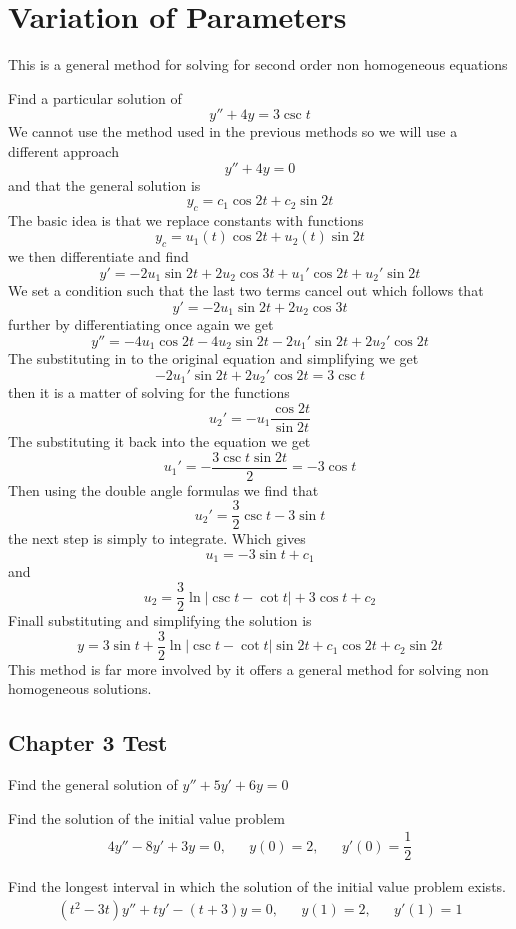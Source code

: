 \section {Variation of Parameters}
This is a general method for solving for second order non homogeneous equations
\begin{example}
	Find a particular solution of \[ y'' + 4y = 3 \csc t \] We cannot use the method used in the previous methods so we will use a different approach \[ y'' + 4y = 0 \] and that the general solution is \[ y_c = c_1 \cos 2t + c_2 \sin 2t \] The basic idea is that we replace constants with functions \[ y_c = u_1(t) \cos 2t + u_2(t) \sin 2t \] we then differentiate and find 
	\[ y' = -2u_1\sin 2t + 2 u_2 \cos 3t + u_1' \cos 2t + u_2 ' \sin 2t\] We set a condition such that the last two terms cancel out which follows that 
	\[  y' = -2u_1\sin 2t + 2 u_2 \cos 3t \] further by differentiating once again we get 
	\[ y'' = -4 u_1 \cos 2t - 4 u_2 \sin 2t - 2u_1' \sin 2t + 2u_2' \cos 2t  \] The substituting in to the original equation and simplifying we get 
	\[ -2u_1' \sin 2t + 2u_2' \cos 2t = 3 \csc t \] then it is a matter of solving for the functions 
	\[ u_2 ' = -u_1 \dfrac{\cos 2t}{\sin 2t} \] The substituting it back into the equation we get 
	\[  u_1' = - \dfrac{3 \csc t \sin 2t}{2} = -3 \cos t\] Then using the double angle formulas we find that 
	\[ u_2' = \dfrac{3}{2} \csc t - 3 \sin t \] the next step is simply to integrate. Which gives \[ u_1 = -3 \sin t + c_1 \] and \[ u_2 = \dfrac{3}{2} \ln | \csc t - \cot t | + 3 \cos t + c_2 \] Finall substituting and simplifying the solution is 
	\[ y = 3 \sin t + \dfrac{3}{2} \ln | \csc t - \cot t | \sin 2t + c_1 \cos 2t + c_2 \sin 2t \]
	This method is far more involved by it offers a general method for solving non homogeneous solutions. 
\end{example}
\begin{multicols*}{2}
	
\section{Chapter 3 Test}

	\begin{q}
		Find the general solution of $y'' + 5y' + 6y = 0$
	\end{q}
	\begin{q}
		Find the solution of the initial value problem  
		\begin{align*}
		4y'' - 8y' + 3y = 0, && y(0)=2, && y'(0)=\dfrac{1}{2}
		\end{align*}
	\end{q}
	\begin{q}
		Find the longest interval in which the solution of the initial value problem exists.
		\begin{align*}
		(t^2-3t)y'' + ty' - (t+3)y = 0, && y(1)=2, && y'(1)=1
		\end{align*}
	\end{q}
\end{multicols*}
